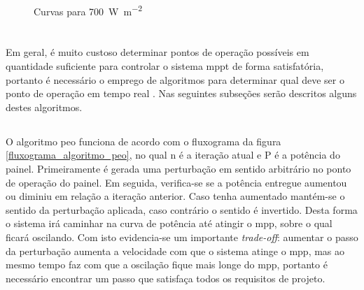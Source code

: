 \begin{figure}[!htpb]
\begin{center}
\caption{Curvas para \SI[per-mode=symbol]{700}{\watt\per\square\meter}}
\label{figura_comparacao_700}
\end{center}
\end{figure}

\section{}

Em geral, é muito custoso determinar pontos de operação possíveis em quantidade suficiente para controlar o sistema \gls{mppt} de forma satisfatória, portanto é necessário o emprego de algoritmos para determinar qual deve ser o ponto de operação em tempo real \cite{al2016}. Nas seguintes subseções serão descritos alguns destes algoritmos.

\subsection{}

O algoritmo \gls{peo} funciona de acordo com o fluxograma da figura \ref{fluxograma_algoritmo_peo}, no qual n é a iteração atual e P é a potência do painel. Primeiramente é gerada uma perturbação em sentido arbitrário no ponto de operação do painel. Em seguida, verifica-se se a potência entregue aumentou ou diminiu em relação a iteração anterior. Caso tenha aumentado mantém-se o sentido da perturbação aplicada, caso contrário o sentido é invertido. Desta forma o sistema irá caminhar na curva de potência até atingir o \gls{mpp}, sobre o qual ficará oscilando. Com isto evidencia-se um importante \textit{trade-off}: aumentar o passo da perturbação aumenta a velocidade com que o sistema atinge o \gls{mpp}, mas ao mesmo tempo faz com que a oscilação fique mais longe do \gls{mpp}, portanto é necessário encontrar um passo que satisfaça todos os requisitos de projeto.

